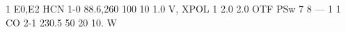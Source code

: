 \documentclass[12pt,a4]{article}
\begin{document}
\frontpage
%
%
%
%
%
\EMIRparameters
 {1}     %
 {E0,E2}    %
 {HCN}   %
 {1-0}   %
 {88.6,260}  %
 {100}   %
 {10}    %
 {1.0}   %
 {V, XPOL}     %
%
%
 \EMIRmap
  {1}   %
  {2.0} %
  {2.0} %
  {OTF} %
  {PSw} %
  {7}   %
  {8} %
  {---} %
%
%
%
%
\HERAparameters
 {1}     %
 {1}     %
 {CO}    %
 {2-1}   %
 {230.5} %
 {50}    %
 {20}    %
 {10.}   %
 {W}     %
\end{document}
